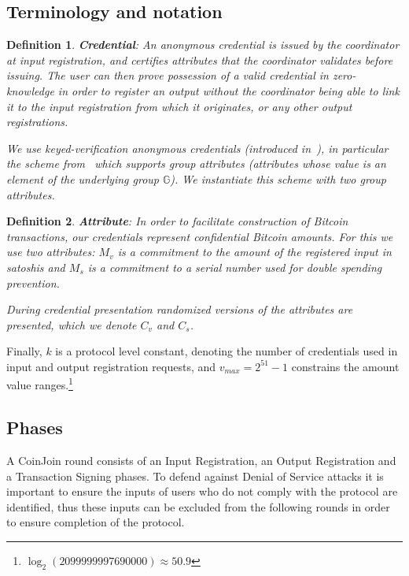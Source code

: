 \documentclass{article}
\newtheorem{definition}{Definition}[section]
\begin{document}
\subsection{Terminology and notation}

\begin{definition} \textbf{Credential}:
An anonymous credential is issued by the coordinator at input registration, and certifies attributes that the coordinator validates before issuing. The user can then prove possession of a valid credential in zero-knowledge in order to register an output without the coordinator being able to link it to the input registration from which it originates, or any other output registrations.

We use keyed-verification anonymous credentials (introduced in~\cite{chase2014algebraic}), in particular the scheme from~\cite{chase2019signal} which supports group attributes (attributes whose value is an element of the underlying group $\mathbb{G}$). We instantiate this scheme with two group attributes.
\end{definition}

\begin{definition}\textbf{Attribute}:
In order to facilitate construction of Bitcoin transactions, our credentials represent confidential Bitcoin amounts. For this we use two attributes: $M_v$ is a commitment to the amount of the registered input in satoshis and $M_s$ is a commitment to a serial number used for double spending prevention.

During credential presentation randomized versions of the attributes are presented, which we denote $C_v$ and $C_s$.
\end{definition}

Finally, $k$ is a protocol level constant, denoting the number of credentials used in input and output registration requests, and $v_{\mathit{max}} = 2^{51}-1$ constrains the amount value ranges.\footnote{$\log_2(2099999997690000) \approx 50.9$}

\subsection{Phases}

A CoinJoin round consists of an Input Registration, an Output Registration and a Transaction Signing phases. To defend against Denial of Service attacks it is important to ensure the inputs of users who do not comply with the protocol are identified, thus these inputs can be excluded from the following rounds in order to ensure completion of the protocol.
\end{document}
